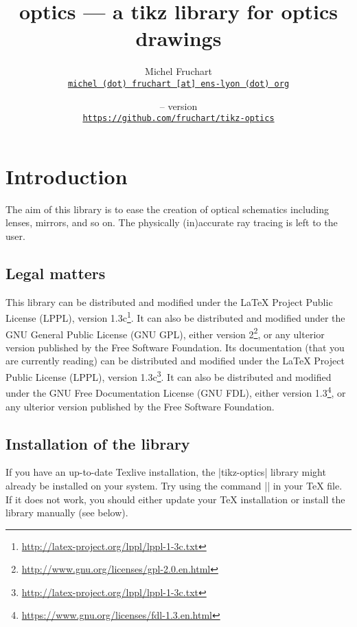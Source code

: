 \documentclass[a4paper]{ltxdoc}
\begin{document}
\VerbatimFootnotes

\title{optics --- a tikz library for optics drawings}
\author{Michel Fruchart \\
\href{mailto:michel (dot) fruchart [at] ens-lyon (dot) org}{\texttt{michel (dot) fruchart [at] ens-lyon (dot) org}}}

\date{\tikzopticsversiondate{} -- version \tikzopticsversion \\[0.15cm]
\large\href{https://github.com/fruchart/tikz-optics}{\texttt{https://github.com/fruchart/tikz-optics}}}

\maketitle

\section{Introduction}

The aim of this library is to ease the creation of optical schematics including lenses, mirrors, and so on.
The physically (in)accurate ray tracing is left to the user.


\subsection{Legal matters}

This library can be distributed and modified under the LaTeX Project Public License (LPPL), version 1.3c\footnote{\url{http://latex-project.org/lppl/lppl-1-3c.txt}}. It can also be distributed and modified under the GNU General Public License (GNU GPL), either version 2\footnote{\url{http://www.gnu.org/licenses/gpl-2.0.en.html}}, or any ulterior version published by the Free Software Foundation.
Its documentation (that you are currently reading) can be distributed and modified under the LaTeX Project Public License (LPPL), version 1.3c\footnote{\url{http://latex-project.org/lppl/lppl-1-3c.txt}}. It can also be distributed and modified under the GNU Free Documentation License (GNU FDL), either version 1.3\footnote{\url{https://www.gnu.org/licenses/fdl-1.3.en.html}}, or any ulterior version published by the Free Software Foundation.

\subsection{Installation of the library}

If you have an up-to-date Texlive installation, the |tikz-optics| library might already be installed on your system. Try using the command |\usetikzlibrary{optics}| in your \TeX{} file. If it does not work, you should either update your \TeX{} installation or install the library manually (see below).
\end{document}
